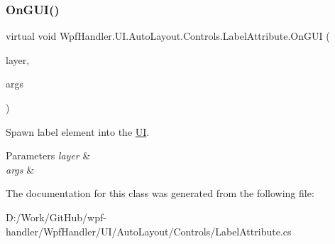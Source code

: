 \subsubsection{\texorpdfstring{On\+G\+U\+I()}{OnGUI()}}
{\footnotesize\ttfamily virtual void Wpf\+Handler.\+U\+I.\+Auto\+Layout.\+Controls.\+Label\+Attribute.\+On\+G\+UI (\begin{DoxyParamCaption}\item[{ref \mbox{\hyperlink{class_wpf_handler_1_1_u_i_1_1_auto_layout_1_1_layout_layer}{Layout\+Layer}}}]{layer,  }\item[{params object \mbox{[}$\,$\mbox{]}}]{args }\end{DoxyParamCaption})\hspace{0.3cm}{\ttfamily [virtual]}}



Spawn label element into the \mbox{\hyperlink{namespace_wpf_handler_1_1_u_i}{UI}}. 


\begin{DoxyParams}{Parameters}
{\em layer} & \\
\hline
{\em args} & \\
\hline
\end{DoxyParams}


The documentation for this class was generated from the following file\+:\begin{DoxyCompactItemize}
\item 
D\+:/\+Work/\+Git\+Hub/wpf-\/handler/\+Wpf\+Handler/\+U\+I/\+Auto\+Layout/\+Controls/Label\+Attribute.\+cs\end{DoxyCompactItemize}

